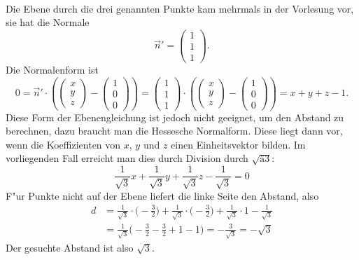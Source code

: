\begin{loesung}
\begin{align*}
\end{align*}
Die Ebene durch die drei genannten Punkte kam mehrmals in der Vorlesung
vor, sie hat die Normale
\[
\vec n'=\begin{pmatrix}1\\1\\1\end{pmatrix}.
\]
Die Normalenform ist
\[
0
=
\vec n'\cdot \left(\begin{pmatrix}x\\y\\z\end{pmatrix}-\begin{pmatrix}1\\0\\0\end{pmatrix}\right)
=
\begin{pmatrix}1\\1\\1\end{pmatrix}
\cdot \left(\begin{pmatrix}x\\y\\z\end{pmatrix}-\begin{pmatrix}1\\0\\0\end{pmatrix}\right)
=
x+y+z-1.
\]
Diese Form der Ebenengleichung ist jedoch nicht geeignet, um den Abstand
zu berechnen, dazu braucht man die Hessesche Normalform. Diese liegt
dann vor, wenn die Koeffizienten von $x$, $y$ und $z$ einen
Einheitsvektor bilden. Im vorliegenden Fall erreicht man dies durch
Division durch $\sqrt{ä3}$:
\[
\frac1{\sqrt{3}}x
+
\frac1{\sqrt{3}}y
+
\frac1{\sqrt{3}}z
-
\frac1{\sqrt{3}}
=0
\]
F"ur Punkte nicht auf der Ebene liefert die linke Seite den Abstand,
also 
\begin{align*}
d&=
\frac1{\sqrt{3}}
\cdot
\biggl(-\frac32\biggr)
+
\frac1{\sqrt{3}}
\cdot
\biggl(-\frac32\biggr)
+
\frac1{\sqrt{3}}
\cdot 1
-\frac1{\sqrt{3}}
\\
&=\frac1{\sqrt{3}}\biggl(
-\frac32-\frac32+1-1
\biggr)
=-\frac3{\sqrt{3}}=-\sqrt{3}
\end{align*}
Der gesuchte Abstand ist also $\sqrt{3}$.
\end{loesung}
